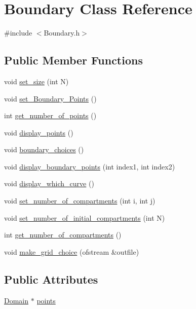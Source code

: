 \hypertarget{class_boundary}{}\section{Boundary Class Reference}
\label{class_boundary}


{\ttfamily \#include $<$Boundary.\+h$>$}

\subsection*{Public Member Functions}
\begin{DoxyCompactItemize}
\item 
void \hyperlink{class_boundary_a809810ee0436124876ee18d0026d52d4}{set\+\_\+size} (int N)
\item 
void \hyperlink{class_boundary_abd07c6ec01953355779802ceefa6cf45}{set\+\_\+\+Boundary\+\_\+\+Points} ()
\item 
int \hyperlink{class_boundary_aa8c6fd642200c117cd40fb96f6ea7125}{get\+\_\+number\+\_\+of\+\_\+points} ()
\item 
void \hyperlink{class_boundary_a41a9097d2719db8755135ab1f6cc5dae}{display\+\_\+points} ()
\item 
void \hyperlink{class_boundary_acfc57bff0ea604020c6af6326559adea}{boundary\+\_\+choices} ()
\item 
void \hyperlink{class_boundary_a7611f77aad78315d4393aa2bf6c4102a}{display\+\_\+boundary\+\_\+points} (int index1, int index2)
\item 
void \hyperlink{class_boundary_ac6efa301f35e2a16f679812b5ae9f3c0}{display\+\_\+which\+\_\+curve} ()
\item 
void \hyperlink{class_boundary_ace24f1af65c2bd016b0d07b8672c7cf7}{set\+\_\+number\+\_\+of\+\_\+compartments} (int i, int j)
\item 
void \hyperlink{class_boundary_a46f816bb8cd7d30f6ee610911f09dd3c}{set\+\_\+number\+\_\+of\+\_\+initial\+\_\+compartments} (int N)
\item 
int \hyperlink{class_boundary_a53c3c48ca4535bb1f4727a81ecf520a2}{get\+\_\+number\+\_\+of\+\_\+compartments} ()
\item 
void \hyperlink{class_boundary_a13e26d040c633adb3092e8fb0877f783}{make\+\_\+grid\+\_\+choice} (ofstream \&outfile)
\end{DoxyCompactItemize}
\subsection*{Public Attributes}
\begin{DoxyCompactItemize}
\item 
\hyperlink{class_domain}{Domain} $\ast$ \hyperlink{class_boundary_afe159eca3abe85fd1e12c34842552a84}{points}
\end{DoxyCompactItemize}

